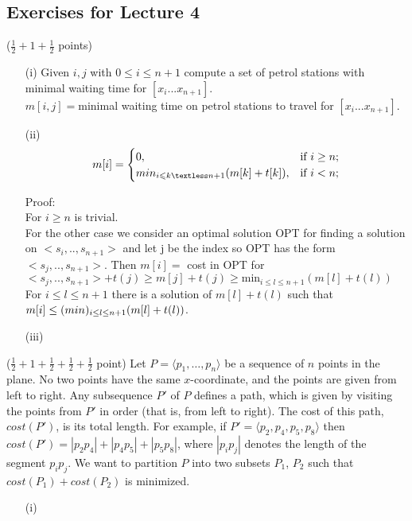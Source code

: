 \documentclass{article}
\newcommand{\cost}{\mathit{cost}}
\renewcommand{\leq}{\leqslant}
\newcounter{rcounter}
\newenvironment{rlist}%
{\begin{list}{A.2-\arabic{rcounter}}{\usecounter{rcounter}}}{\end{list}}
\newcounter{rcountermem}
\begin{document}
\subsection*{Exercises for Lecture 4}
\begin{rlist}
\setcounter{rcounter}{\value{rcountermem}}
\item ($\frac{1}{2}+1+\frac{1}{2}$ points) 
      \begin{enumerate}
      \item[(i)] 
Given $i,j$ with $0\leq i \leq n+1$ compute a set of petrol stations with minimal waiting time for $[x_i ... x_{n+1}]$. \\
$m[i,j]=$minimal waiting time on petrol stations to travel  for $[x_i ... x_{n+1}]$.
      \item[(ii)] \[
m[i]=
\begin{cases}
0, &\text{if $i \ge n$;}\\
min_{i\leq k\textless n+1} (m[k]+t[k]), &\text{if $i < n$;} 
\end{cases}
\]

Proof: \\
For $i\ge n$ is trivial. \\

For the other case we consider an optimal solution OPT for finding a solution on $<s_i,..,s_{n+1}>$ and let j be the index so OPT has the form $<s_j,..,s_{n+1}>$. Then $m[i]=$ cost in OPT for $< s_j,..,s_{n+1} >+ t(j) \ge m[j]+t(j) \ge \text{min}_{i\le l \le n+1}(m[l]+t(l))$ \\

For $i\le l \le n+1$ there is a solution of $m[l] + t(l)$ such that $m[i] \le \text(min)_{i \le l \le n+1}(m[l]+t(l))$.
      \item[(iii)] 
\begin{algorithmic}[1]
\ENDFOR
{}
\ENDFOR
{}
\end{algorithmic}

      \end{enumerate}
\item ($\frac{1}{2}+1+\frac{1}{2}+\frac{1}{2}+\frac{1}{2}$ point)
      Let $P=\langle p_1,\ldots,p_n \rangle$ be a sequence of $n$ points in the plane.
      No two points have the same $x$-coordinate, and the points are given from left to right.
      Any subsequence $P'$ of $P$ defines a path, which is given by visiting the points
      from $P'$ in order (that is, from left to right). The cost of this path, $\cost(P')$,
      is its total length. For example, if $P' = \langle p_2, p_4, p_5, p_8\rangle$ then
      $\cost(P') = |p_2p_4| + |p_4p_5| + |p_5p_8|$, where $|p_ip_j|$ denotes the
      length of the segment $p_ip_j$. We want to partition $P$ into two subsets $P_1$, $P_2$
      such that $\cost(P_1)+\cost(P_2)$ is minimized.
      \begin{enumerate}
      \item[(i)]


\end{enumerate}
\end{rlist}
\end{document}
